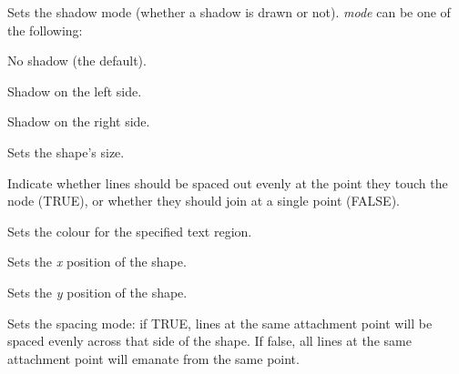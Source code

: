 
Sets the shadow mode (whether a shadow is drawn or not). {\it mode} can be one of
the following:

\begin{description}\itemsep=0pt
\item[SHADOW\_NONE] No shadow (the default).
\item[SHADOW\_LEFT] Shadow on the left side.
\item[SHADOW\_RIGHT] Shadow on the right side.
\end{description}



Sets the shape's size.



Indicate whether lines should be spaced out evenly at the point they touch the node (TRUE), or whether they
should join at a single point (FALSE).



Sets the colour for the specified text region.



Sets the {\it x} position of the shape.



Sets the {\it y} position of the shape.



Sets the spacing mode: if TRUE, lines at the same attachment point will be
spaced evenly across that side of the shape. If false, all lines at the
same attachment point will emanate from the same point.



